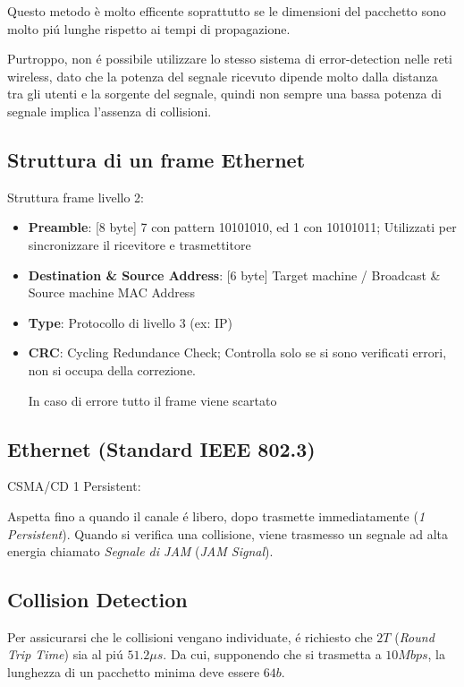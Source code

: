 \documentclass{article}
\begin{document}
Questo metodo \`e molto efficente soprattutto se le dimensioni del pacchetto sono molto pi\'u lunghe rispetto ai tempi di propagazione.

Purtroppo, non \'e possibile utilizzare lo stesso sistema di error-detection nelle reti wireless, dato che la potenza del segnale ricevuto dipende molto dalla distanza tra gli utenti e la sorgente del segnale, quindi non sempre una bassa potenza di segnale implica l'assenza di collisioni.

\subsection{Struttura di un frame Ethernet}

Struttura frame livello 2:
\begin{itemize}
    \item \textbf{Preamble}: [8 byte] 7 con pattern 10101010, ed 1 con 10101011; Utilizzati per sincronizzare il ricevitore e trasmettitore
    \item \textbf{Destination \& Source Address}: [6 byte] Target machine / Broadcast \& Source machine MAC Address
    \item \textbf{Type}: Protocollo di livello 3 (ex: IP)
    \item \textbf{CRC}: Cycling Redundance Check; Controlla solo se si sono verificati errori, non si occupa della correzione.

        In caso di errore tutto il frame viene scartato
\end{itemize}

\subsection{Ethernet (Standard IEEE 802.3)}

CSMA/CD 1 Persistent:

Aspetta fino a quando il canale \'e libero, dopo trasmette immediatamente (\textit{1 Persistent}).
Quando si verifica una collisione, viene trasmesso un segnale ad alta energia chiamato \textit{Segnale di JAM} (\textit{JAM Signal}).

\subsection{Collision Detection}

Per assicurarsi che le collisioni vengano individuate, \'e richiesto che $2T$ (\textit{Round Trip Time}) sia al pi\'u $51.2\mu s$.
Da cui, supponendo che si trasmetta a $10Mbps$, la lunghezza di un pacchetto minima deve essere $64b$.
\end{document}
